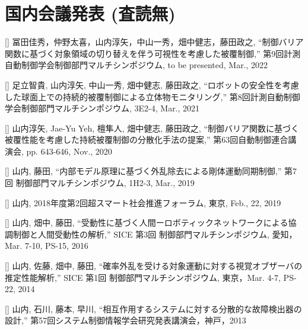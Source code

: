 \documentclass[letterpaper]{article}
\newcounter{conf}
\newcounter{jconf}
\begin{document}
\section*{国内会議発表 (査読無)}

[]  
  冨田佳秀，仲野太喜，山内淳矢，中山一秀，畑中健志，藤田政之,
  ``制御バリア関数に基づく対象領域の切り替えを伴う可視性を考慮した被覆制御,'' 
  第9回計測自動制御学会制御部門マルチシンポジウム, to be presented, Mar., 2022 \\
\addtocounter{jconf}{-1}

[]  
  足立智貴, 山内淳矢, 中山一秀, 畑中健志, 藤田政之, 
  ``ロボットの安全性を考慮した球面上での持続的被覆制御による立体物モニタリング,'' 
  第8回計測自動制御学会制御部門マルチシンポジウム, 3E2-4, Mar., 2021 \\
\addtocounter{jconf}{-1}

[]  
  山内淳矢, Jae-Yu Yeh, 檀隼人, 畑中健志, 藤田政之, 
  ``制御バリア関数に基づく被覆性能を考慮した持続被覆制御の分散化手法の提案,'' 
  第63回自動制御連合講演会, pp. 643-646, Nov., 2020 \\
\addtocounter{jconf}{-1}

[]  
  山内, 藤田, 
  ``内部モデル原理に基づく外乱除去による剛体運動同期制御,'' 
  第7回 制御部門マルチシンポジウム, 1H2-3, Mar., 2019 \\
\addtocounter{jconf}{-1}

[]  
  山内, 2018年度第2回超スマート社会推進フォーラム, 東京, Feb., 22, 2019 \\
\addtocounter{jconf}{-1}

[]  
  山内, 畑中, 藤田,
  ``受動性に基づく人間ーロボティックネットワークによる協調制御と人間受動性の解析,''
  SICE 第3回 制御部門マルチシンポジウム, 愛知，Mar. 7-10, PS-15, 2016 \\
\addtocounter{jconf}{-1}

[]  
  山内, 佐藤, 畑中, 藤田,
  ``確率外乱を受ける対象運動に対する視覚オブザーバの推定性能解析,''
  SICE 第1回 制御部門マルチシンポジウム, 東京，Mar. 4-7, PS-22, 2014 \\
\addtocounter{jconf}{-1}

[] 
  山内, 石川, 藤本, 早川,
  ``相互作用するシステムに対する分散的な故障検出器の設計,''
  第57回システム制御情報学会研究発表講演会，神戸，2013 \\
\addtocounter{jconf}{-1}
\end{document}
